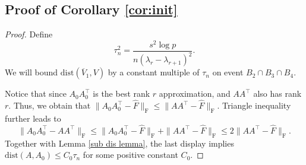 \documentclass[11pt]{article}
\newcommand{\red}{\color{red}}
\newcommand{\norminit}{\widetilde{A}_0} %
\newcommand{\scale}{V}
\newcommand{\gd}{\overline{V}}
\newcommand{\dist}{\mathrm{dist}}
\newcommand{\0}{{\mathbf{0}}}
\newcommand{\ssecond}{{\widehat{\Sigma}}}
\begin{document}
\subsection{Proof of Corollary \ref{cor:init}}
\begin{proof}
Define 
\begin{equation*}
\tau_n^2= \frac{s^2\log p}{n(\lambda_r-\lambda_{r+1})^2}.
\end{equation*} 
We will bound $\dist(\gd_1, V)$ by a constant multiple of $\tau_n$ on event $B_2\cap B_3\cap B_4$. 

Notice that since $A_0A_0^\top$ is the best rank $r$ approximation, and $AA^\top$ also has rank $r$.
Thus, we obtain that $\|A_0A_0^\top -\widehat{F} \|_\mathrm{F}\leq \|AA^\top -\widehat{F} \|_\mathrm{F}$. 
Triangle inequality further leads to
\begin{equation*}
\|A_0A_0^\top -AA^\top \|_\mathrm{F}\leq \|A_0A_0^\top -\widehat{F} \|_\mathrm{F}+ \|AA^\top -\widehat{F} \|_\mathrm{F}\leq 2 \|AA^\top -\widehat{F} \|_\mathrm{F}.
\end{equation*} 
Together with Lemma \ref{sub dis lemma}, the last display implies $\text{dist}(A,A_0)\leq C_0\tau_n$ for some positive constant $C_0$.  



\end{proof}
\end{document}
